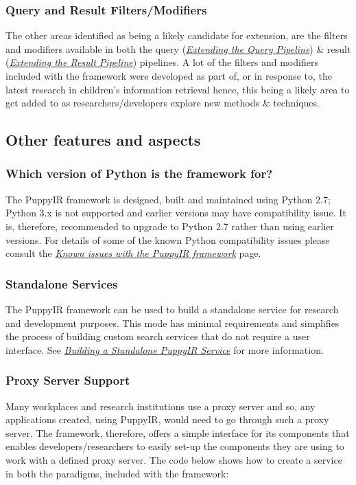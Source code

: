 \documentclass[letterpaper,10pt,english]{sphinxmanual}
\begin{document}
\subsubsection{Query and Result Filters/Modifiers}
\label{overview:query-and-result-filters-modifiers}
The other areas identified as being a likely candidate for extension, are the filters and modifiers available in both the query ({\hyperref[extendingQuery:extending-the-query-pipeline]{\emph{Extending the Query Pipeline}}}) \& result ({\hyperref[extendingResult:extending-the-result-pipeline]{\emph{Extending the Result Pipeline}}}) pipelines. A lot of the filters and modifiers included with the framework were developed as part of, or in response to, the latest research in children's information retrieval hence, this being a likely area to get added to as researchers/developers explore new methods \& techniques.


\subsection{Other features and aspects}
\label{overview:other-features-and-aspects}

\subsubsection{Which version of Python is the framework for?}
\label{overview:which-version-of-python-is-the-framework-for}
The PuppyIR framework is designed, built and maintained using Python 2.7; Python 3.x is not supported and earlier versions may have compatibility issue. It is, therefore, recommended to upgrade to Python 2.7 rather than using earlier versions. For details of some of the known Python compatibility issues please consult the {\hyperref[issues:issues]{\emph{Known issues with the PuppyIR framework}}} page.


\subsubsection{Standalone Services}
\label{overview:standalone-services}
The PuppyIR framework can be used to build a standalone service for research and development purposes. This mode has minimal requirements and simplifies the process of building custom search services that do not require a user interface. See {\hyperref[standalone-service:building-a-standalone-puppyir-service]{\emph{Building a Standalone PuppyIR Service}}} for more information.


\subsubsection{Proxy Server Support}
\label{overview:proxy-server-support}
Many workplaces and research institutions use a proxy server and so, any applications created, using PuppyIR, would need to go through such a proxy server. The framework, therefore, offers a simple interface for its components that enables developers/researchers to easily set-up the components they are using to work with a defined proxy server. The code below shows how to create a service in both the paradigms, included with the framework:
\end{document}
